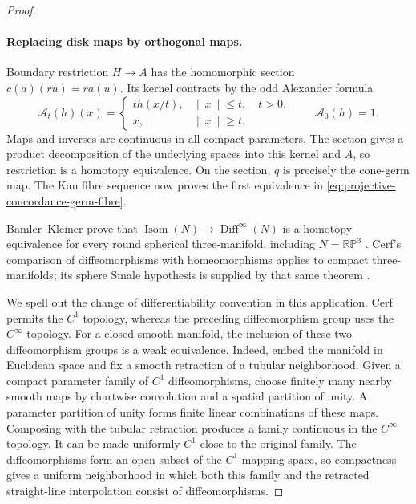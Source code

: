 \begin{proof}
\paragraph{Replacing disk maps by orthogonal maps.}
Boundary restriction $H\to A$ has the homomorphic
section $c(a)(ru)=r a(u)$.  Its kernel contracts by
the odd Alexander formula
\[
 \mathcal A_t(h)(x)=
 \begin{cases}
  t h(x/t),&\|x\|\leq t,\quad t>0,\\
  x,&\|x\|\geq t,
 \end{cases}
 \qquad\mathcal A_0(h)=1.
\]
Maps and inverses are continuous in all compact
parameters.  The section gives a product decomposition
of the underlying spaces into this kernel and $A$,
so restriction is a homotopy equivalence.
On the section, $q$ is precisely the cone-germ map.
The Kan fibre sequence now proves the first equivalence
in \eqref{eq:projective-concordance-germ-fibre}.

Bamler--Kleiner prove that
$\operatorname{Isom}(N)\to\operatorname{Diff}^{\infty}(N)$
is a homotopy equivalence for every round spherical
three-manifold, including $N=\mathbb{RP}^3$
\cite[Theorem~1.3, p.~2; proof p.~108]{BamlerKleiner2019Metrics}.
Cerf's comparison of diffeomorphisms with homeomorphisms
applies to compact three-manifolds; its sphere Smale
hypothesis is supplied by that same theorem
\cite[III, \S3.2.1, Theorem~8, p.~365, and Corollary~1,
p.~366; proof pp.~367--370]{Cerf1961}.

We spell out the change of differentiability convention
in this application.  Cerf permits the $C^1$ topology,
whereas the preceding diffeomorphism group uses the
$C^{\infty}$ topology.  For a closed smooth manifold,
the inclusion of these two diffeomorphism groups is
a weak equivalence.  Indeed, embed the manifold in
Euclidean space and fix a smooth retraction of a
tubular neighborhood.  Given a compact parameter
family of $C^1$ diffeomorphisms, choose finitely many
nearby smooth maps by chartwise convolution and a
spatial partition of unity.  A parameter partition
of unity forms finite linear combinations of these
maps.  Composing with the tubular retraction produces
a family continuous in the $C^{\infty}$ topology.
It can be made uniformly $C^1$-close to the original
family.  The diffeomorphisms form an open subset of
the $C^1$ mapping space, so compactness gives a
uniform neighborhood in which both this family and
the retracted straight-line interpolation consist
of diffeomorphisms.


\end{proof}
